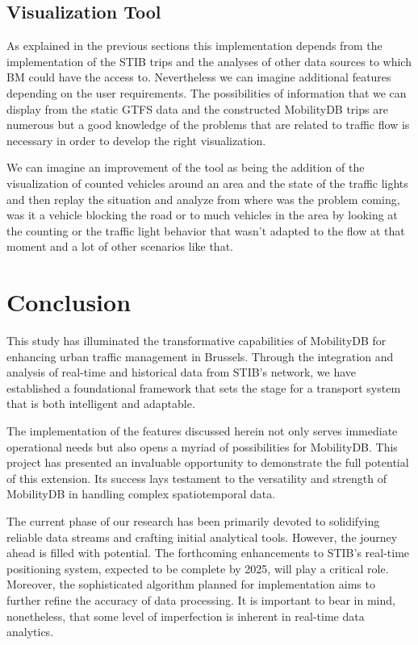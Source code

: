 \documentclass[12pt]{report}
\begin{document}
	\section{Visualization Tool}
	
	As explained in the previous sections this implementation depends from the implementation of the STIB trips and the analyses of  other data sources to which BM could have the access to. Nevertheless we can imagine  additional features depending on the user requirements. The possibilities of information that we can display from the static GTFS data and the constructed  MobilityDB trips are numerous
	but a good  knowledge of the problems that are related to traffic flow  is necessary in order to develop the right visualization.
	
	We can imagine an improvement of the tool as being the addition of the visualization of counted vehicles around an area and  the state of the traffic lights and then replay the situation and analyze from where was the problem coming, was it a vehicle blocking the road or to  much vehicles in the area by looking at the counting or the traffic light behavior that wasn't adapted to the flow at that moment and a lot  of other scenarios like that. 
	
	\chapter{Conclusion}
	
	This study has illuminated the transformative capabilities of MobilityDB for enhancing urban traffic management in Brussels. Through the integration and analysis of real-time and historical data from STIB's network, we have established a foundational framework that sets the stage for a transport system that is both intelligent and adaptable.
	
	The implementation of the features discussed herein not only serves immediate operational needs but also opens a myriad of possibilities for MobilityDB. This project has presented an invaluable opportunity to demonstrate the full potential of this extension. Its success lays testament to the versatility and strength of MobilityDB in handling complex spatiotemporal data.
	
	The current phase of our research has been primarily devoted to solidifying reliable data streams and crafting initial analytical tools. However, the journey ahead is filled with potential. The forthcoming enhancements to STIB's real-time positioning system, expected to be complete by 2025, will play a critical role. Moreover, the sophisticated algorithm planned for implementation aims to further refine the accuracy of data processing. It is important to bear in mind, nonetheless, that some level of imperfection is inherent in real-time data analytics.
	
\end{document}
